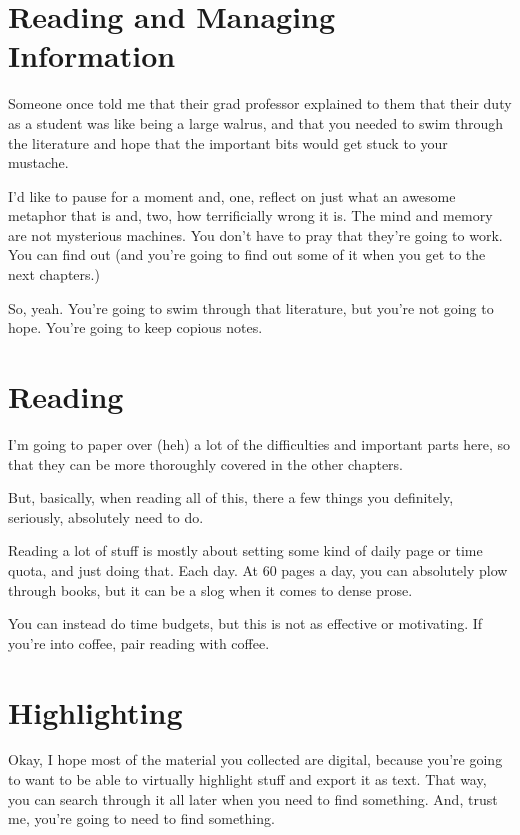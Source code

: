 \section{Reading and Managing Information}

Someone once told me that their grad professor explained to them that their
duty as a student was like being a large walrus, and that you needed to swim
through the literature and hope that the important bits would get stuck to your
mustache.

I'd like to pause for a moment and, one, reflect on just what an awesome
metaphor that is and, two, how terrificially wrong it is. The mind and memory
are not mysterious machines. You don't have to pray that they're going to
work. You can find out (and you're going to find out some of it when you get to
the next chapters.)

So, yeah. You're going to swim through that literature, but you're not going to
hope. You're going to keep copious notes.

\section{Reading}

I'm going to paper over (heh) a lot of the difficulties and important parts
here, so that they can be more thoroughly covered in the other chapters.

But, basically, when reading all of this, there a few things you definitely,
seriously, absolutely need to do.

Reading a lot of stuff is mostly about setting some kind of daily page or time
quota, and just doing that. Each day. At 60 pages a day, you can absolutely plow
through books, but it can be a slog when it comes to dense prose.

You can instead do time budgets, but this is not as effective or motivating. If
you're into coffee, pair reading with coffee.

\section{Highlighting}

Okay, I hope most of the material you collected are digital, because you're
going to want to be able to virtually highlight stuff and export it as
text. That way, you can search through it all later when you need to find
something. And, trust me, you're going to need to find something.

